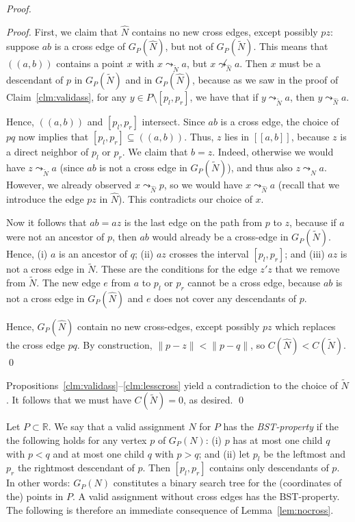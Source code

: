 \documentclass[envcountsect,envcountsame,runningheads,a4paper]{llncs}
\newcommand\R{{\mathbb R}}
\begin{document}
\begin{proof}
\begin{proof}
First, we claim that $\widehat{N}$ contains
no new cross edges, except possibly $pz$:
suppose $ab$ is a cross edge
of $G_P(\widehat{N})$, but not of $G_P(\widetilde{N})$.
This means that $((a,b))$ contains a point $x$
with $x \leadsto_{\widetilde{N}} a$,
but $x \not\leadsto_{\widehat{N}} a$.
Then $x$
must be a descendant of $p$ in $G_P(\widetilde{N})$ and in
$G_P(\widehat{N})$, because
as we saw in the proof of Claim~\ref{clm:validass},
for any $y \in P \setminus [p_l, p_r]$, we have that if $y \leadsto_{\widetilde{N}} a$,
then $y \leadsto_{\widehat{N}} a$.

Hence, $((a,b))$ and $[p_l, p_r]$ intersect.
Since $ab$ is a cross edge, the choice of $pq$ now implies that
$[p_l, p_r] \subseteq ((a,b))$.
Thus, $z$ lies in $[[a,b]]$, because $z$ is a direct neighbor of $p_l$ or $p_r$.
We claim that $b = z$. Indeed, otherwise we would have $z \leadsto_{\widetilde{N}} a$
(since $ab$ is not a cross edge in $G_P(\widetilde{N})$), and thus also
$z \leadsto_{\widehat{N}} a$. However, we already observed
$x \leadsto_{\widehat{N}} p$, so we would have
$x \leadsto_{\widehat{N}} a$ (recall that we introduce the edge $pz$
in $\widehat{N}$).
This contradicts our choice of $x$.

Now it follows that $ab = az$ is the last
edge on the path from $p$ to $z$, because if $a$ were not an ancestor
of $p$, then $ab$ would already be a cross-edge in $G_P(\widetilde{N})$.
Hence, (i) $a$ is an ancestor of $q$; (ii) $az$ crosses the interval
$[p_l, p_r]$; and (iii) $az$ is not a cross edge in $\widetilde{N}$.
These are the conditions for the edge $z' z$ that
we remove from $\widetilde{N}$.
The new edge $e$ from $a$ to $p_l$ or $p_r$ cannot be a cross edge,
because $ab$ is not a cross edge in $G_P(\widehat{N})$ and $e$ does
not cover any descendants of $p$.

Hence, $G_P(\widehat{N})$  contain no new cross-edges,
except possibly $pz$ which replaces
the cross edge $pq$.
By construction, $\|p-z\| < \|p-q\|$, so
$C(\widehat{N}) < C(\widetilde{N})$.
\qed{}
\end{proof}

\noindent
Propositions~\ref{clm:validass}--\ref{clm:lesscross}
yield a contradiction to the choice of $\widetilde{N}$.
It follows that we must have $C(\widetilde{N}) = 0$, as desired.
\qed{}
\end{proof}

Let $P \subset\R$.
We say that a valid assignment $N$ for $P$ has the \emph{BST-property} if the
the following holds for any vertex $p$ of $G_P(N)$:
(i) $p$ has at most one child $q$ with $p < q$ and at most
one child $q$ with $p > q$; and (ii) let $p_l$ be the
leftmost and $p_r$ the rightmost descendant of $p$.
Then $[p_l, p_r]$ contains only descendants of $p$.
In other words: $G_P(N)$ constitutes a binary
search tree for the (coordinates of the) points in $P$.
A valid assignment without cross edges has
the BST-property. The following is therefore an immediate consequence of Lemma~\ref{lem:nocross}.
\end{document}
